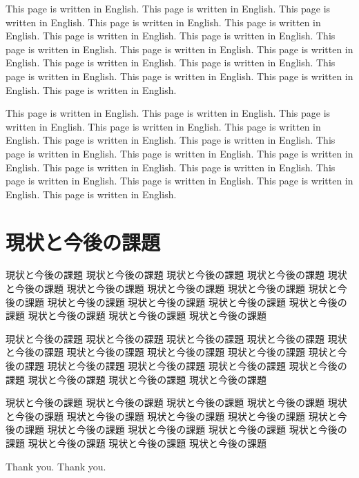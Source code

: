 \documentclass[12pt]{jarticle} %
\begin{document}
This page is written in English. This page is written in English. 
This page is written in English. This page is written in English. 
This page is written in English. This page is written in English. 
This page is written in English. This page is written in English. 
This page is written in English. This page is written in English. 
This page is written in English. This page is written in English. 
This page is written in English. This page is written in English. 
This page is written in English. This page is written in English. 

This page is written in English. This page is written in English. 
This page is written in English. This page is written in English. 
This page is written in English. This page is written in English. 
This page is written in English. This page is written in English. 
This page is written in English. This page is written in English. 
This page is written in English. This page is written in English. 
This page is written in English. This page is written in English. 
This page is written in English. This page is written in English. 


\newpage
\section{現状と今後の課題}
\label{kadai}

現状と今後の課題 現状と今後の課題 現状と今後の課題 現状と今後の課題 
現状と今後の課題 現状と今後の課題 現状と今後の課題 現状と今後の課題 
現状と今後の課題 現状と今後の課題 現状と今後の課題 現状と今後の課題 
現状と今後の課題 現状と今後の課題 現状と今後の課題 現状と今後の課題 

現状と今後の課題 現状と今後の課題 現状と今後の課題 現状と今後の課題 
現状と今後の課題 現状と今後の課題 現状と今後の課題 現状と今後の課題 
現状と今後の課題 現状と今後の課題 現状と今後の課題 現状と今後の課題 
現状と今後の課題 現状と今後の課題 現状と今後の課題 現状と今後の課題 

現状と今後の課題 現状と今後の課題 現状と今後の課題 現状と今後の課題 
現状と今後の課題 現状と今後の課題 現状と今後の課題 現状と今後の課題 
現状と今後の課題 現状と今後の課題 現状と今後の課題 現状と今後の課題 
現状と今後の課題 現状と今後の課題 現状と今後の課題 現状と今後の課題 

%
%
\acknowledgements

Thank you. Thank you.
%
%
\newpage


%
%
\appendix
\end{document}
